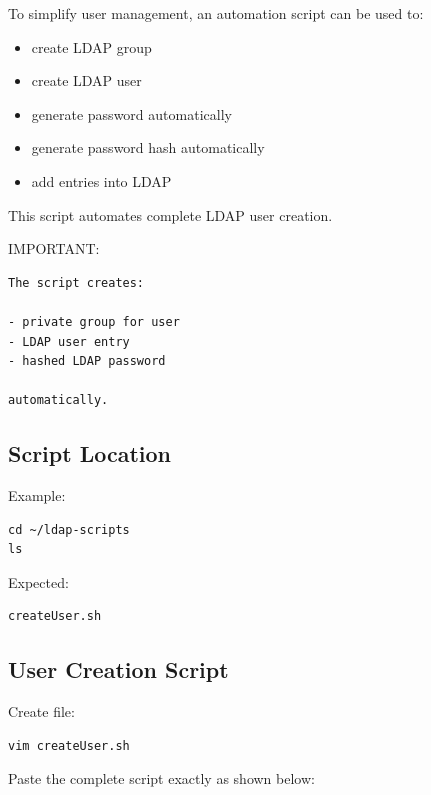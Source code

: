 \documentclass[11pt]{article}
\begin{document}
To simplify user management, an automation script can be used to:

\begin{itemize}
\item create LDAP group
\item create LDAP user
\item generate password automatically
\item generate password hash automatically
\item add entries into LDAP
\end{itemize}

This script automates complete LDAP user creation.

IMPORTANT:

\begin{verbatim}
The script creates:

- private group for user
- LDAP user entry
- hashed LDAP password

automatically.
\end{verbatim}
\subsection{Script Location}
\label{sec:org7fe57fd}

Example:

\begin{verbatim}
cd ~/ldap-scripts
ls
\end{verbatim}

Expected:

\begin{verbatim}
createUser.sh
\end{verbatim}
\subsection{User Creation Script}
\label{sec:orgbcdbf9d}

Create file:

\begin{verbatim}
vim createUser.sh
\end{verbatim}

Paste the complete script exactly as shown below:
\end{document}

